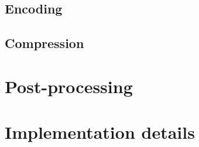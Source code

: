 




\subsection {Encoding}

\subsection {Compression}

\section{Post-processing}
\label{sec:postprocessing}


\section{Implementation details}
\label{sec:implementation-details}

